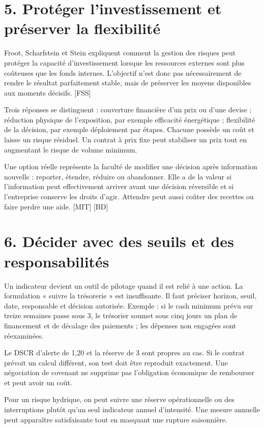 \documentclass[12pt,a4paper]{article}
\begin{document}
\section*{5. Protéger l’investissement et préserver la flexibilité}
Froot, Scharfstein et Stein expliquent comment la gestion des risques peut protéger la capacité d’investissement lorsque les ressources externes sont plus coûteuses que les fonds internes. L’objectif n’est donc pas nécessairement de rendre le résultat parfaitement stable, mais de préserver les moyens disponibles aux moments décisifs. [FSS]


Trois réponses se distinguent : couverture financière d’un prix ou d’une devise ; réduction physique de l’exposition, par exemple efficacité énergétique ; flexibilité de la décision, par exemple déploiement par étapes. Chacune possède un coût et laisse un risque résiduel. Un contrat à prix fixe peut stabiliser un prix tout en augmentant le risque de volume minimum.


Une option réelle représente la faculté de modifier une décision après information nouvelle : reporter, étendre, réduire ou abandonner. Elle a de la valeur si l’information peut effectivement arriver avant une décision réversible et si l’entreprise conserve les droits d’agir. Attendre peut aussi coûter des recettes ou faire perdre une aide. [MIT] [BD]

\section*{6. Décider avec des seuils et des responsabilités}
Un indicateur devient un outil de pilotage quand il est relié à une action. La formulation « suivre la trésorerie » est insuffisante. Il faut préciser horizon, seuil, date, responsable et décision autorisée. Exemple : si le cash minimum prévu sur treize semaines passe sous 3, le trésorier soumet sous cinq jours un plan de financement et de décalage des paiements ; les dépenses non engagées sont réexaminées.


Le DSCR d’alerte de 1,20 et la réserve de 3 sont propres au cas. Si le contrat prévoit un calcul différent, son test doit être reproduit exactement. Une négociation de covenant ne supprime pas l’obligation économique de rembourser et peut avoir un coût.


Pour un risque hydrique, on peut suivre une réserve opérationnelle ou des interruptions plutôt qu’un seul indicateur annuel d’intensité. Une mesure annuelle peut apparaître satisfaisante tout en masquant une rupture saisonnière.
\end{document}
